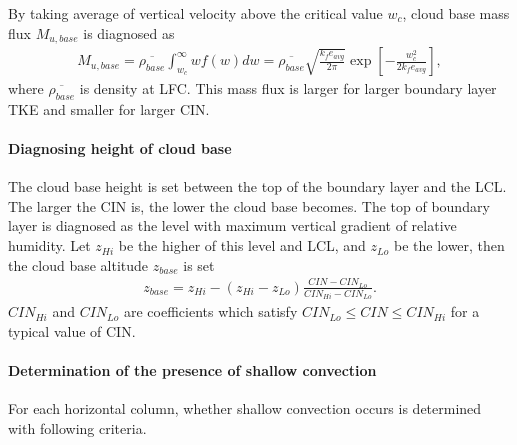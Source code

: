 By taking average of vertical velocity above the critical value \(w_c\), cloud base mass flux \(M_{u,base}\) is diagnosed as \begin{eqnarray}\label{Mubase}
    M_{u,base}=\overline{\rho_{base}}\int_{w_c}^{\infty}wf(w)dw =\overline{\rho_{base}}\sqrt{\frac{k_f e_{avg}}{2\pi}}\exp\left[-\frac{w_c^2}{2k_fe_{avg}}\right],\end{eqnarray} where \(\overline{\rho_{base}}\) is
density at LFC. This mass flux is larger for larger boundary layer TKE and smaller for larger CIN.

\hypertarget{diagno-height-of-cloud-base}{%
\paragraph{Diagnosing height of cloud base}\label{diagno-height-of-cloud-base}}

The cloud base height is set between the top of the boundary layer and the LCL. The larger the CIN is, the lower the cloud base becomes. The top of boundary layer is diagnosed as the level with
maximum vertical gradient of relative humidity. Let \(z_{Hi}\) be the higher of this level and LCL, and \(z_{Lo}\) be the lower, then the cloud base altitude \(z_{base}\) is set \begin{eqnarray}\label{zbase}
    z_{base} = z_{Hi} - (z_{Hi}-z_{Lo})\frac{CIN-CIN_{Lo}}{CIN_{Hi} - CIN_{Lo}}.\end{eqnarray} \(CIN_{Hi}\) and \(CIN_{Lo}\) are coefficients which satisfy \(CIN_{Lo}\le CIN \le CIN_{Hi}\) for a typical value of
CIN.

\hypertarget{presence-of-shallow-convection}{%
\paragraph{Determination of the presence of shallow convection}\label{presence-of-shallow-convection}}

For each horizontal column, whether shallow convection occurs is determined with following criteria.

